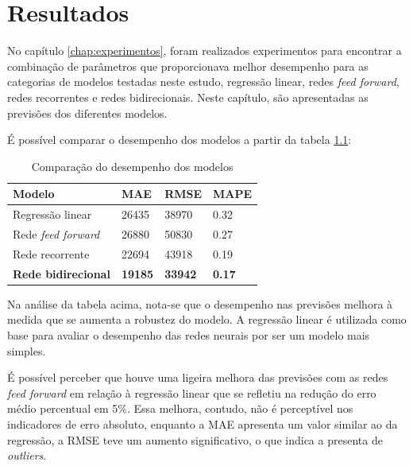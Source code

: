 
\chapter{Resultados}
\label{chap:resultados}

No capítulo \ref{chap:experimentos}, foram realizados experimentos para encontrar a combinação de 
parâmetros que proporcionava melhor desempenho para as categorias de modelos 
testadas neste estudo, regressão linear, redes \textit{feed forward}, redes
recorrentes e redes bidirecionais. Neste capítulo, são apresentadas as previsões 
dos diferentes modelos.

É possível comparar o desempenho dos modelos a partir da tabela \ref{tab:compara_modelos}:

\begin{table}[H]
    \centering
    \begin{tabular}{llll}
        \toprule
        Modelo & MAE     & RMSE    & MAPE \\
        \midrule
        Regressão linear & 26435 & 38970 & 0.32  \\
        Rede \textit{feed forward} & 26880  & 50830 & 0.27 \\
        Rede recorrente & 22694 & 43918 & 0.19  \\
        \textbf{Rede bidirecional} & \textbf{19185} & \textbf{33942} & \textbf{0.17} \\
        \bottomrule
    \end{tabular}
    \caption{Comparação do desempenho dos modelos}
    \label{tab:compara_modelos}
\end{table}

Na análise da tabela acima, nota-se que o desempenho nas previsões
melhora à medida que se aumenta a robustez do modelo. A regressão linear é utilizada 
como base para avaliar o desempenho das redes neurais por ser um modelo mais 
simples. 

É possível perceber que houve uma ligeira melhora das previsões com as 
redes \textit{feed forward} em relação à regressão linear que se refletiu na 
redução do erro médio percentual
em 5\%. Essa melhora, contudo, não é perceptível nos indicadores de erro absoluto,
enquanto a MAE apresenta um valor similar ao da regressão, a RMSE teve um 
aumento significativo, o que indica a presenta de \textit{outliers}.


